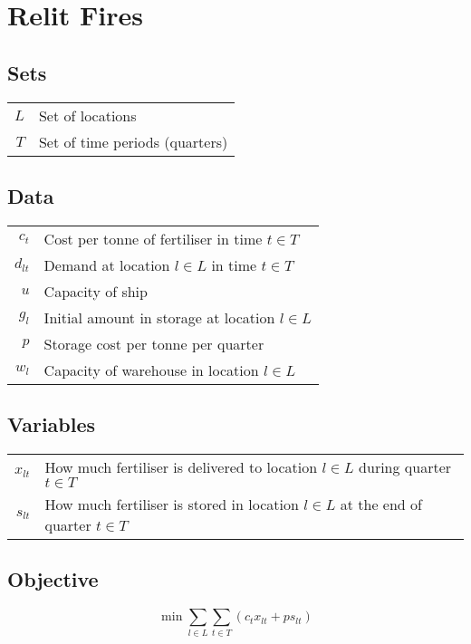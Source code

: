 \documentclass{article}
\begin{document}
	\section*{Relit Fires}
	\subsection*{Sets}
	
	\begin{tabular}{rl}
		$L$ & Set of locations\\
		$T$ & Set of time periods (quarters)
	\end{tabular}

	\subsection*{Data}
	
	\begin{tabular}{rl}
		$c_t$ & Cost per tonne of fertiliser in time $t\in T$\\
		$d_{lt}$ & Demand at location $l\in L$ in time $t\in T$\\
		$u$ & Capacity of ship\\
		$g_l$ & Initial amount in storage at location $l\in L$\\
		$p$ & Storage cost per tonne per quarter\\
		$w_l$ & Capacity of warehouse in location $l\in L$
	\end{tabular}

	\subsection*{Variables}
	
	\begin{tabular}{rl}
		$x_{lt}$ & How much fertiliser is delivered to location $l\in L$ during quarter $t\in T$\\
		$s_{lt}$ & How much fertiliser is stored in location $l\in L$ at the end of quarter $t\in T$
	\end{tabular}

	\subsection*{Objective}
	\begin{equation*}
	\min \sum_{l\in L}\sum_{t\in T}(c_t x_{lt} + ps_{lt})
	\end{equation*}
	
\end{document}

